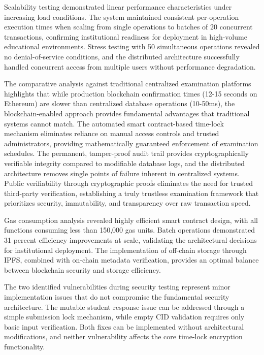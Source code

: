 \documentclass[12pt,a4paper]{article}
\begin{document}
Scalability testing demonstrated linear performance characteristics under increasing load conditions. The system maintained consistent per-operation execution times when scaling from single operations to batches of 20 concurrent transactions, confirming institutional readiness for deployment in high-volume educational environments. Stress testing with 50 simultaneous operations revealed no denial-of-service conditions, and the distributed architecture successfully handled concurrent access from multiple users without performance degradation.

The comparative analysis against traditional centralized examination platforms highlights that while production blockchain confirmation times (12-15 seconds on Ethereum) are slower than centralized database operations (10-50ms), the blockchain-enabled approach provides fundamental advantages that traditional systems cannot match. The automated smart contract-based time-lock mechanism eliminates reliance on manual access controls and trusted administrators, providing mathematically guaranteed enforcement of examination schedules. The permanent, tamper-proof audit trail provides cryptographically verifiable integrity compared to modifiable database logs, and the distributed architecture removes single points of failure inherent in centralized systems. Public verifiability through cryptographic proofs eliminates the need for trusted third-party verification, establishing a truly trustless examination framework that prioritizes security, immutability, and transparency over raw transaction speed.

Gas consumption analysis revealed highly efficient smart contract design, with all functions consuming less than 150,000 gas units. Batch operations demonstrated 31 percent efficiency improvements at scale, validating the architectural decisions for institutional deployment. The implementation of off-chain storage through IPFS, combined with on-chain metadata verification, provides an optimal balance between blockchain security and storage efficiency.

The two identified vulnerabilities during security testing represent minor implementation issues that do not compromise the fundamental security architecture. The mutable student response issue can be addressed through a simple submission lock mechanism, while empty CID validation requires only basic input verification. Both fixes can be implemented without architectural modifications, and neither vulnerability affects the core time-lock encryption functionality.
\end{document}
